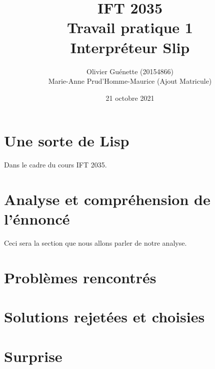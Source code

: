 \documentclass[12pt, letterpaper]{article}
\title{IFT 2035 \\  Travail pratique 1 \\ Interpréteur Slip}
\author{Olivier Guénette (20154866) \\ Marie-Anne Prud'Homme-Maurice (Ajout Matricule)}
\date{21 octobre 2021}
\begin{document}
\maketitle

\section*{Une sorte de Lisp}

Dans le cadre du cours IFT 2035.

\section{Analyse et compréhension de l'énnoncé}
Ceci sera la section que nous allons parler de notre analyse.

\section{Problèmes rencontrés}

\section{Solutions rejetées et choisies}

\section{Surprise}
\end{document}
